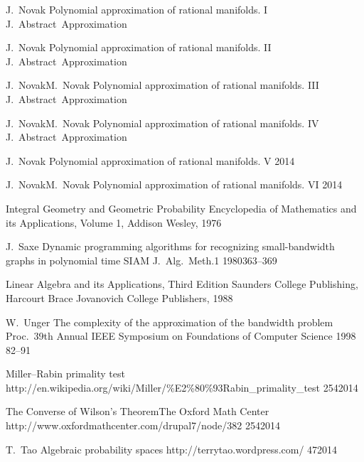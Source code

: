 \documentclass[12pt,a4paper,titlepage,openany]{report}
\begin{document}
\begin{thebibliography}{99}
   \clanekVRevijiEnAvtorSprejetVObjavo
     {J.~Novak}
   {Polynomial approximation of rational manifolds. I}
     {J.~Abstract~Approximation}

   \clanekVRevijiEnAvtorVTisku
     {J.~Novak}
   {Polynomial approximation of rational manifolds. II}
     {J.~Abstract~Approximation}

   \clanekVRevijiVecAvtorjevSprejetVObjavo
     {J.~Novak}{M.~Novak}
   {Polynomial approximation of rational manifolds. III}
     {J.~Abstract~Approximation}

   \clanekVRevijiVecAvtorjevVTisku
     {J.~Novak}{M.~Novak}
   {Polynomial approximation of rational manifolds. IV}
     {J.~Abstract~Approximation}

   \clanekVRevijiEnAvtorPoslanVObjavo
     {J.~Novak}
   {Polynomial approximation of rational manifolds. V}
     {2014}

   \clanekVRevijiVecAvtorjevPoslanVObjavo
     {J.~Novak}{M.~Novak}
   {Polynomial approximation of rational manifolds. VI}
     {2014}

   {Integral Geometry and Geometric Probability}
    {Encyclopedia of Mathematics and its Applications, Volume 1, Addison Wesley, 1976}

   \clanekVRevijiEnAvtor
     {J.~Saxe}
   {Dynamic programming algorithms for recognizing small-bandwidth graphs in polynomial time}
     {SIAM J.~Alg.~Meth.}{1}
     {1980}{363--369}

   {Linear Algebra and its Applications, Third Edition}
    {Saunders College \hbox{Publishing}, Harcourt Brace Jovanovich College Publishers, 1988}

\konferencniClanekEnAvtor
    {W.~Unger}
    {The complexity of the approximation of the bandwidth problem}
    {Proc.~39th Annual IEEE Symposium on Foundations of Computer Science}
    {1998}
    {82--91}

\spletniVirBrezAvtorja
    {Miller--Rabin primality test}
    {\newline http://en.wikipedia.org/wiki/Miller/\%E2\%80\%93Rabin\_primality\_test}
    {25}{4}{2014}

\spletniVirBrezAvtorjaZInstitucijo
    {The Converse of Wilson's Theorem}{The Oxford Math Center}
    {http://www.oxfordmathcenter.com/drupal7/node/382}
    {25}{4}{2014}

\spletniVirZAvtorjem
    {T.~Tao}
    {Algebraic probability spaces}
    {http://terrytao.wordpress.com/}
    {4}{7}{2014}

\end{thebibliography}
\newpage
\end{document}
